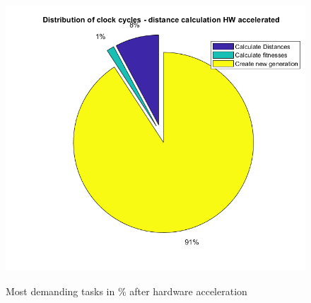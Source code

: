 \begin{figure}[H]
	\centering
	{\includegraphics[width=\textwidth]{Images/cycle_distribution_HW_accelerated.png}}\\[0.5cm]
	\caption{Most demanding tasks in \% after hardware acceleration}
	\label{fig:timing_pie_hw}
\end{figure}
